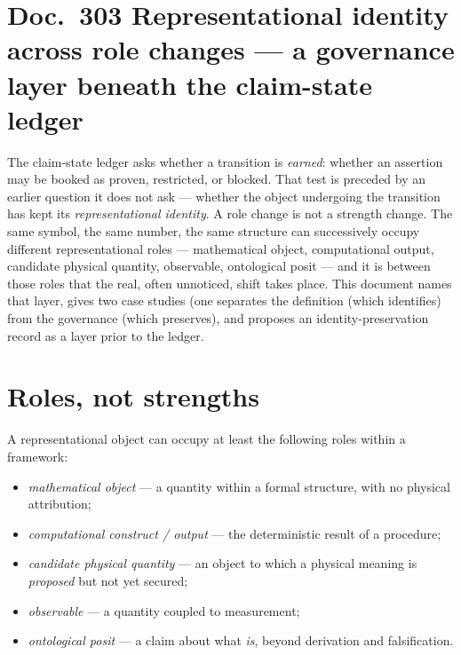 
\section*{Doc.~303 \quad Representational identity across role changes ---
a governance layer beneath the claim-state ledger}

The claim-state ledger asks whether a transition is \emph{earned}: whether an assertion
may be booked as proven, restricted, or blocked. That test is preceded by an earlier
question it does not ask --- whether the object undergoing the transition has kept its
\emph{representational identity}. A role change is not a strength change. The same symbol,
the same number, the same structure can successively occupy different representational
roles --- mathematical object, computational output, candidate physical quantity,
observable, ontological posit --- and it is between those roles that the real, often
unnoticed, shift takes place. This document names that layer, gives two case studies (one
separates the definition (which identifies) from the governance (which
preserves), and proposes an identity-preservation record as a layer prior to the ledger.

\section{Roles, not strengths}

A representational object can occupy at least the following roles within a framework:

\begin{itemize}
\item \emph{mathematical object} --- a quantity within a formal structure, with no
physical attribution;
\item \emph{computational construct / output} --- the deterministic result of a
procedure;
\item \emph{candidate physical quantity} --- an object to which a physical meaning is
\emph{proposed} but not yet secured;
\item \emph{observable} --- a quantity coupled to measurement;
\item \emph{ontological posit} --- a claim about what \emph{is}, beyond derivation and
falsification.
\end{itemize}

